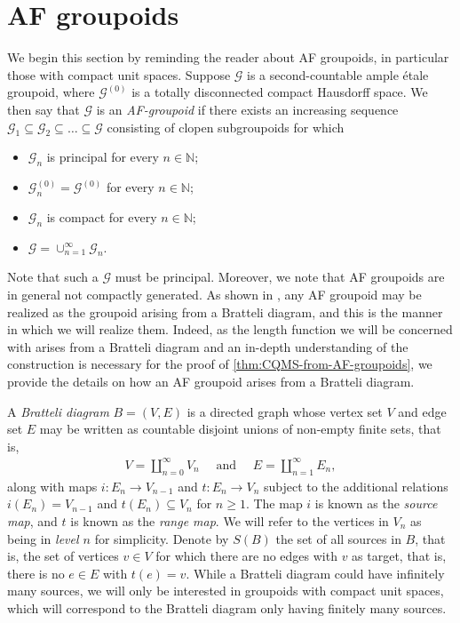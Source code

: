 \documentclass[11pt,a4paper,oneside,final,reqno]{amsart}
\theoremstyle{definition}
\newcommand{\G}{\mathcal{G}}
\newcommand{\Go}{\mathcal{G}^{(0)}}
\newcommand{\N}{\mathbb{N}}
\numberwithin{equation}{section}
\begin{document}
	\section{AF groupoids}\label{sec:AF-groupoids}	
	We begin this section by reminding the reader about AF groupoids, in particular those with compact unit spaces. 
	Suppose $\G$ is a second-countable ample \'etale groupoid, where $\Go$ is a 
	totally disconnected compact Hausdorff space. 
	We then say that $\G$ is an \emph{AF-groupoid} if there exists an increasing sequence $\G_1 \subseteq \G_2 \subseteq \ldots \subseteq \G$ consisting of clopen subgroupoids for which
	\begin{itemize}
		\item $\G_n$ is principal for every $n\in \N$;
		\item $\G_n^{(0)}  = \Go$ for every $n \in \N$;
		\item $\G_n$ 
		is compact for every $n \in \N$;
		\item $\G = \cup_{n=1}^\infty \G_n$.
	\end{itemize}
	Note that such a $\G$ must be principal. Moreover, we note that AF groupoids are in general not compactly generated. As shown in \parencite[Theorem 3.9]{GiordanoPutnamSkau2004}, any AF groupoid may be realized as the groupoid arising from a Bratteli diagram,
	and this is the manner in which we will realize them. Indeed, as the length function we will be concerned with arises from a Bratteli diagram and an in-depth understanding of the construction is necessary for the proof of \cref{thm:CQMS-from-AF-groupoids}, we provide the details on how an AF groupoid arises from a Bratteli diagram.
	
	A \emph{Bratteli diagram} $B = (V,E)$ is a directed graph whose vertex set $V$ and edge set $E$ may be written as countable disjoint unions of non-empty finite sets, that is,
	\begin{align*}
		V =  \coprod_{n=0}^\infty V_n \quad \text{ and } \quad E =  \coprod_{n = 1}^\infty E_n ,
	\end{align*}
	along with maps $i \colon E_n \to V_{n-1}$ and $t \colon E_n \to V_n$ 
	subject to the additional relations $i(E_n) = V_{n-1}$ and $t(E_n) \subseteq V_n$ for $n\geq 1$. The map $i$ is known as the \emph{source map}, and $t$ is known as the \emph{range map}. We will refer to the vertices in $V_n$ as being in \emph{level $n$} for simplicity. Denote by $S(B)$ the set of all sources in $B$, that is, the set of vertices $v \in V$ for which there are no edges with $v$ as target, that is, there is no $e \in E$ with $t(e) = v$. 
	While a Bratteli diagram could have infinitely many sources, 
	we will only be interested in groupoids with compact unit spaces, which will correspond to the Bratteli diagram only having finitely many sources. 
	
\end{document}
